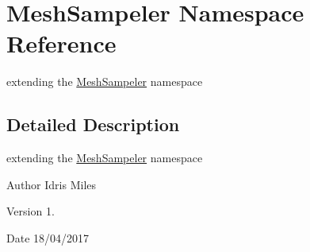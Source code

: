 \hypertarget{namespaceMeshSampeler}{}\section{Mesh\+Sampeler Namespace Reference}
\label{namespaceMeshSampeler}


extending the \hyperlink{namespaceMeshSampeler}{Mesh\+Sampeler} namespace  




\subsection{Detailed Description}
extending the \hyperlink{namespaceMeshSampeler}{Mesh\+Sampeler} namespace 

\begin{DoxyAuthor}{Author}
Idris Miles 
\end{DoxyAuthor}
\begin{DoxyVersion}{Version}
1. 
\end{DoxyVersion}
\begin{DoxyDate}{Date}
18/04/2017 
\end{DoxyDate}
